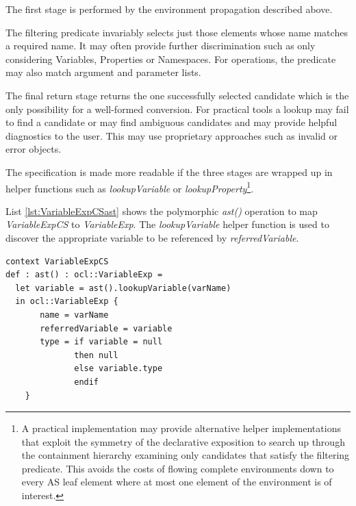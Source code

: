 \documentclass{llncs}
\begin{document}
The first stage is performed by the environment propagation described above.

The filtering predicate invariably selects just those elements whose name matches a required name. It may often provide further discrimination such as only considering Variables, Properties or Namespaces. For operations, the predicate may also match argument and parameter lists.

The final return stage returns the one successfully selected candidate which is the only possibility for a well-formed conversion. For practical tools a lookup may fail to find a candidate or may find ambiguous candidates and may provide helpful diagnostics to the user. This may use proprietary approaches such as invalid or error objects. %

The specification is made more readable if the three stages are wrapped up in helper functions such as \emph{lookupVariable} or \emph{lookupProperty}\footnote{A practical implementation may provide alternative helper implementations that exploit the symmetry of the declarative exposition to search up through the containment hierarchy examining only candidates that satisfy the filtering predicate. This avoids the costs of flowing complete environments down to every AS leaf element where at most one element of the environment is of interest.}.

List \ref{lst:VariableExpCSast} shows the polymorphic \emph{ast()} operation to map \emph{VariableExpCS} to \emph{VariableExp}. The  \emph{lookupVariable} helper function is used to discover the appropriate variable to be referenced by \emph{referredVariable}.

\begin{lstlisting}[caption=CS2AS description for VarableExpCS to VariableExp, label=lst:VariableExpCSast, language=OCL]
context VariableExpCS
def : ast() : ocl::VariableExp =
  let variable = ast().lookupVariable(varName)
  in ocl::VariableExp {
       name = varName
       referredVariable = variable
       type = if variable = null
              then null
       	      else variable.type
       	      endif
   	}
\end{lstlisting}

	
\end{document}

